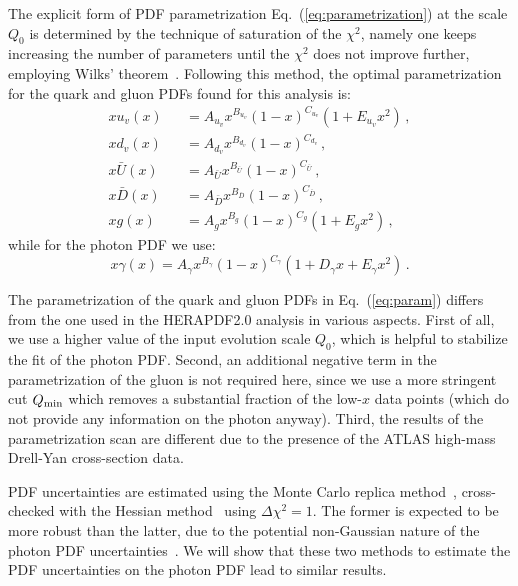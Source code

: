 The explicit form of PDF parametrization Eq.~(\ref{eq:parametrization})
at the scale $Q_0$ is determined by the
technique of saturation of the $\chi^{2}$, namely one keeps increasing
the number of parameters until the $\chi^{2}$ does not improve
further, employing Wilks' theorem~\cite{Wilks:1938dza}.
%
Following this method, the optimal parametrization for the quark and
gluon PDFs found for this analysis is:
\begin{eqnarray}
  \nonumber
  xu_v(x) &&= A_{u_v}x^{B_{u_v}}(1-x)^{C_{u_v}}(1+E_{u_v}x^{2})\, , \\
  \nonumber
xd_v(x) &&= A_{d_v}x^{B_{d_v}}(1-x)^{C_{d_v}}\, , \\
x\bar{U}(x) &&= A_{\bar{U}}x^{B_{\bar{U}}}(1-x)^{C_{\bar{U}}}\, , \\
\nonumber
x\bar{D}(x) &&= A_{\bar{D}}x^{B_{\bar{D}}}(1-x)^{C_{\bar{D}}}\, , \\
\nonumber
\label{eq:param}
xg(x) &&= A_{g}x^{B_{g}}(1-x)^{C_{g}}(1+E_{g}x^{2})\, ,
\end{eqnarray}
while for the photon PDF we use:
\begin{equation}
x\gamma(x) = A_{\gamma}x^{B_{\gamma}}(1-x)^{C_{\gamma}}(1+D_{\gamma}x+E_{\gamma}x^{2}) \, .
\end{equation}


The parametrization of the quark and gluon PDFs in
Eq.~(\ref{eq:param}) differs from the one used in the HERAPDF2.0
analysis in various aspects.
%
First of all, we use a higher value of the input evolution scale
$Q_0$, which is helpful to stabilize the fit of the photon PDF.
%
Second, an additional negative term in the parametrization of the
gluon is not required here, since we use a more stringent cut
$Q_{\rm min}$ which removes a substantial fraction of the low-$x$ data points (which do
not provide any information on the photon anyway).
%
Third, the results of the parametrization scan are different due to
the presence of the ATLAS high-mass Drell-Yan cross-section data.

PDF uncertainties are estimated using the Monte Carlo replica
method~\cite{DelDebbio:2004xtd,DelDebbio:2007ee}, cross-checked with
the Hessian method~\cite{Pumplin:2001ct} using $\Delta\chi^2=1$.
%
The former is expected to be more robust than the latter, due to the
potential non-Gaussian nature of the photon PDF
uncertainties~\cite{Ball:2013hta}.
%
We will show that these two methods to estimate the PDF uncertainties
on the photon PDF lead to similar results.

